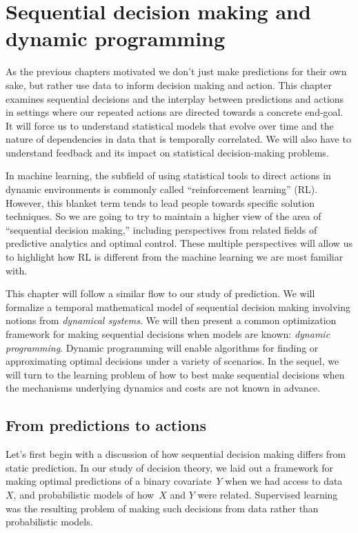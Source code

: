 \documentclass{tufte-book}
\begin{document}
\chapter{Sequential decision making and dynamic programming}

As the previous chapters motivated we don't just make predictions for
their own sake, but rather use data to inform decision making and
action. This chapter examines sequential decisions and the interplay
between predictions and actions in settings where our repeated actions
are directed towards a concrete end-goal. It will force us to understand
statistical models that evolve over time and the nature of dependencies
in data that is temporally correlated. We will also have to understand
feedback and its impact on statistical decision-making problems.

In machine learning, the subfield of using statistical tools to direct
actions in dynamic environments is commonly called ``reinforcement
learning'' (RL). However, this blanket term tends to lead people towards
specific solution techniques. So we are going to try to maintain a
higher view of the area of ``sequential decision making,'' including
perspectives from related fields of predictive analytics and optimal
control. These multiple perspectives will allow us to highlight how RL
is different from the machine learning we are most familiar
with.

This chapter will follow a similar flow to our study of prediction. We
will formalize a temporal mathematical model of sequential decision
making involving notions from \emph{dynamical systems}. We will then
present a common optimization framework for making sequential decisions
when models are known: \emph{dynamic programming}. Dynamic programming
will enable algorithms for finding or approximating optimal decisions
under a variety of scenarios. In the sequel, we will turn to the
learning problem of how to best make sequential decisions when the
mechanisms underlying dynamics and costs are not known in
advance.

\hypertarget{from-predictions-to-actions}{%
\section{From predictions to
actions}\label{from-predictions-to-actions}}

Let's first begin with a discussion of how sequential decision making
differs from static prediction. In our study of decision theory, we laid
out a framework for making optimal predictions of a binary
covariate~\(Y\) when we had access to data~\(X\), and probabilistic
models of how~\(X\) and \(Y\) were related. Supervised learning was the
resulting problem of making such decisions from data rather than
probabilistic models.
\end{document}

